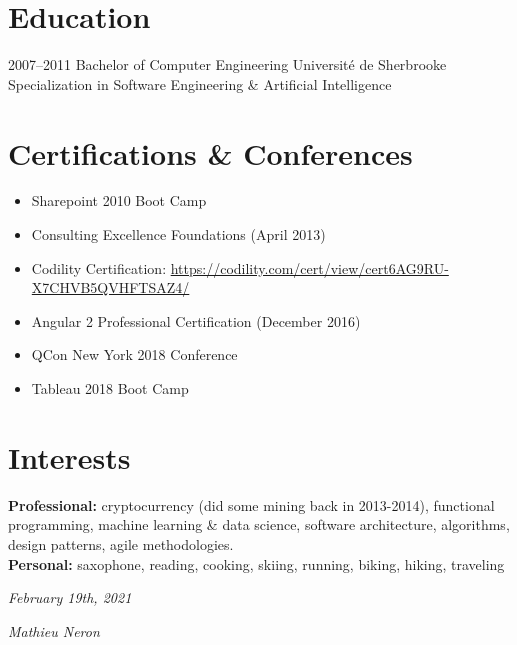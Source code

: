 \documentclass[]{friggeri-cv}
\begin{document}
\section{Education}
\begin{entrylist}
    \entry
{2007--2011}
{Bachelor {\normalfont of Computer Engineering}}
{Université de Sherbrooke}
{Specialization in Software Engineering \& Artificial Intelligence}
\end{entrylist}


\section{Certifications \& Conferences}

\begin{itemize}
	\item Sharepoint 2010 Boot Camp
	\item Consulting Excellence Foundations (April 2013)
	\item Codility Certification: \href{https://codility.com/cert/view/cert6AG9RU-X7CHVB5QVHFTSAZ4/}{https://codility.com/cert/view/cert6AG9RU-X7CHVB5QVHFTSAZ4/}
	\item Angular 2 Professional Certification (December 2016)
	\item QCon New York 2018 Conference
	\item Tableau 2018 Boot Camp
\end{itemize}

\newpage


\section{Interests}

\textbf{Professional:} cryptocurrency (did some mining back in 2013-2014), functional programming, machine learning \& data science, software architecture, algorithms, design patterns, agile methodologies.
\\
\textbf{Personal:} saxophone, reading, cooking, skiing, running, biking, hiking, traveling
\\
\begin{flushleft}
\emph{February 19th, 2021}
\end{flushleft}
\begin{flushright}
\emph{Mathieu Neron}
\end{flushright}
\end{document}
